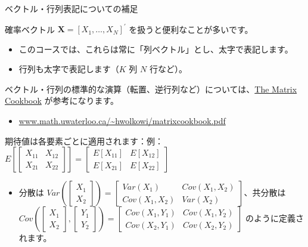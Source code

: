 \documentclass[11pt,handout]{beamer}
\begin{document}
\begin{frame}{ベクトル・行列表記についての補足}

\vspace{0.2cm}
確率ベクトル $\mathbf{X}=[X_1,\dots,X_N]^\prime$ を扱うと便利なことが多いです。

\begin{itemize}
\item このコースでは、これらは常に「列ベクトル」とし、太字で表記します。
\vspace{0.1cm}
\item 行列も太字で表記します（$K$ 列 $N$ 行など）。
\end{itemize}\vspace{0.4cm}\pause{}

ベクトル・行列の標準的な演算（転置、逆行列など）については、\uline{The Matrix Cookbook} が参考になります。

\begin{itemize}
\item \url{www.math.uwaterloo.ca/~hwolkowi/matrixcookbook.pdf}
\end{itemize}\vspace{0.4cm}\pause{}

期待値は各要素ごとに適用されます：例：$E\left[\begin{bmatrix}X_{11}& X_{12}\\X_{21} & X_{22}\end{bmatrix}\right]=\begin{bmatrix}E[X_{11}]& E[X_{12}]\\E[X_{21}] & E[X_{22}]\end{bmatrix}$ 
\begin{itemize}
\item 分散は $Var\left(\begin{bmatrix}X_{1}\\X_{2}\end{bmatrix}\right)=\begin{bmatrix}Var(X_{1}) & Cov(X_{1},X_{2})\\Cov(X_{1},X_{2}) & Var(X_{2})\end{bmatrix}$、共分散は $Cov\left(\begin{bmatrix}X_{1}\\X_{2}\end{bmatrix},\begin{bmatrix}Y_{1}\\Y_{2}\end{bmatrix}\right)=\begin{bmatrix}Cov(X_{1},Y_{1}) & Cov(X_{1},Y_{2})\\Cov(X_{2},Y_{1}) & Cov(X_{2},Y_{2})\end{bmatrix}$ のように定義されます。
\end{itemize}

\end{frame}
\end{document}
